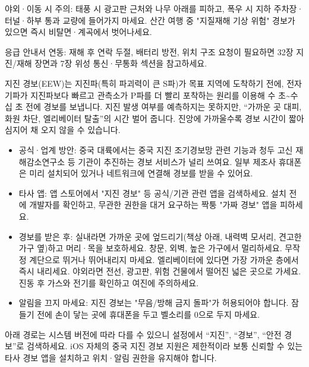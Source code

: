 야외·이동 시 주의: 태풍 시 광고판 근처와 나무 아래를 피하고, 폭우 시 지하 주차장·터널·하부 통과 교량에 들어가지 마세요. 산간 여행 중 "지질재해 기상 위험" 경보가 있으면 즉시 비탈면·계곡에서 벗어나세요.

응급 안내서 연동: 재해 후 연락 두절, 배터리 방전, 위치 구조 요청이 필요하면 32장 지진/재해 장면과 7장 위성 통신·무통화 섹션을 참고하세요.


지진 경보(EEW)는 지진파(특히 파괴력이 큰 S파)가 목표 지역에 도착하기 전에, 전자기파가 지진파보다 빠르고 관측소가 P파를 더 빨리 포착하는 원리를 이용해 수 초\textasciitilde{}수십 초 전에 경보를 보냅니다. 지진 발생 여부를 예측하지는 못하지만, “가까운 곳 대피, 화원 차단, 엘리베이터 탈출”의 시간 벌어 줍니다. 진앙에 가까울수록 경보 시간이 짧아 심지어 채 오지 않을 수 있습니다.

\begin{itemize}
  \item 공식·업계 방안: 중국 대륙에서는 중국 지진 조기경보망 관련 기능과 청두 고신 재해감소연구소 등 기관이 추진하는 경보 서비스가 널리 쓰여요. 일부 제조사 휴대폰은 미리 설치되어 있거나 네트워크에 연결해 경보를 받을 수 있어요.
  \item 타사 앱: 앱 스토어에서 "지진 경보" 등 공식/기관 관련 앱을 검색하세요. 설치 전에 개발자를 확인하고, 무관한 권한을 대거 요구하는 짝퉁 "가짜 경보" 앱을 피하세요.
  \item 경보를 받은 후: 실내라면 가까운 곳에 엎드리기(책상 아래, 내력벽 모서리, 견고한 가구 옆)하고 머리·목을 보호하세요. 창문, 외벽, 높은 가구에서 멀리하세요. 무작정 계단으로 뛰거나 뛰어내리지 마세요. 엘리베이터에 있다면 가장 가까운 층에서 즉시 내리세요. 야외라면 전선, 광고판, 위험 건물에서 떨어진 넓은 곳으로 가세요. 진동 후 가스와 전기를 확인하고 여진에 주의하세요.
  \item 알림을 끄지 마세요: 지진 경보는 "무음/방해 금지 돌파"가 허용되어야 합니다. 잠들기 전에 손이 닿는 곳에 휴대폰을 두고 벨소리를 0으로 두지 마세요.
\end{itemize}


아래 경로는 시스템 버전에 따라 다를 수 있으니 설정에서 “지진”, “경보”, “안전 경보”로 검색하세요. iOS 자체의 중국 지진 경보 지원은 제한적이라 보통 신뢰할 수 있는 타사 경보 앱을 설치하고 위치·알림 권한을 유지해야 합니다.

